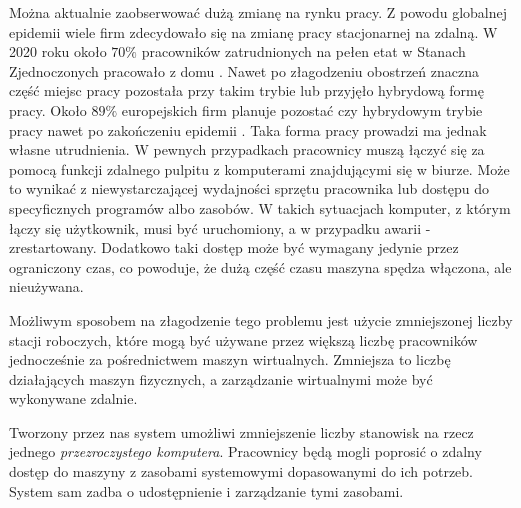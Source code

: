 \documentclass[../wstep.tex]{subfiles}
\begin{document}
Można aktualnie zaobserwować dużą zmianę na rynku pracy.
Z powodu globalnej epidemii wiele firm zdecydowało się na zmianę pracy stacjonarnej na zdalną. W 2020 roku około $70\%$ pracowników zatrudnionych na pełen etat w Stanach Zjednoczonych pracowało z domu \parencite{remote-2020}.
Nawet po złagodzeniu obostrzeń znaczna część miejsc pracy pozostała przy takim trybie lub przyjęło hybrydową formę pracy. Około $89\%$ europejskich firm planuje pozostać czy hybrydowym trybie pracy nawet po zakończeniu epidemii \parencite{remote-2021}.
Taka forma pracy prowadzi ma jednak własne utrudnienia.
W pewnych przypadkach pracownicy muszą łączyć się za pomocą funkcji zdalnego pulpitu z komputerami znajdującymi się w biurze.
Może to wynikać z niewystarczającej wydajności sprzętu pracownika lub dostępu do specyficznych programów albo zasobów.
W takich sytuacjach komputer, z którym łączy się użytkownik, musi być uruchomiony, a w przypadku awarii - zrestartowany.
Dodatkowo taki dostęp może być wymagany jedynie przez ograniczony czas, co powoduje, że dużą część czasu maszyna spędza włączona, ale nieużywana.

Możliwym sposobem na złagodzenie tego problemu jest użycie zmniejszonej liczby stacji roboczych, które mogą być używane przez większą liczbę pracowników jednocześnie za pośrednictwem maszyn wirtualnych.
Zmniejsza to liczbę działających maszyn fizycznych, a zarządzanie wirtualnymi może być wykonywane zdalnie.

Tworzony przez nas system umożliwi zmniejszenie liczby stanowisk na rzecz jednego \textit{przezroczystego komputera}.
Pracownicy będą mogli poprosić o zdalny dostęp do maszyny z zasobami systemowymi dopasowanymi do ich potrzeb.
System sam zadba o udostępnienie i zarządzanie tymi zasobami.
\end{document}
